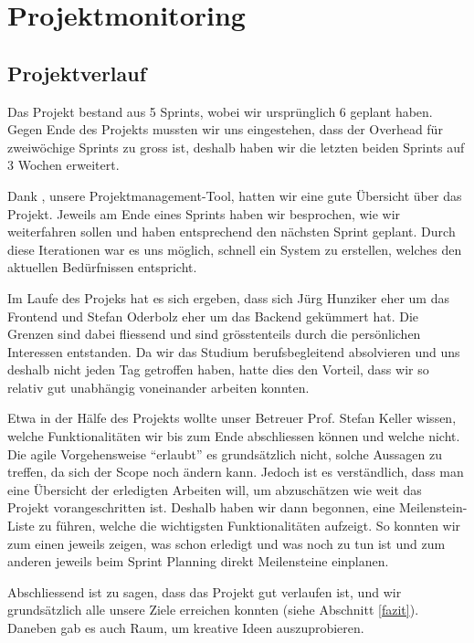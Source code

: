 \chapter{Projektmonitoring}
\label{projektmonitoring}





\section{Projektverlauf}
Das Projekt bestand aus 5 Sprints, wobei wir ursprünglich 6 geplant haben.
Gegen Ende des Projekts mussten wir uns eingestehen, dass der Overhead für zweiwöchige Sprints zu gross ist, deshalb haben wir die letzten beiden Sprints auf 3 Wochen erweitert.

Dank , unsere Projektmanagement-Tool, hatten wir eine gute Übersicht über das Projekt.
Jeweils am Ende eines Sprints haben wir besprochen, wie wir weiterfahren sollen und haben entsprechend den nächsten Sprint geplant.
Durch diese Iterationen war es uns möglich, schnell ein System zu erstellen, welches den aktuellen Bedürfnissen entspricht.

Im Laufe des Projeks hat es sich ergeben, dass sich Jürg Hunziker eher um das Frontend und Stefan Oderbolz eher um das Backend gekümmert hat.
Die Grenzen sind dabei fliessend und sind grösstenteils durch die persönlichen Interessen entstanden.
Da wir das Studium berufsbegleitend absolvieren und uns deshalb nicht jeden Tag getroffen haben, hatte dies den Vorteil, dass wir so relativ gut unabhängig voneinander arbeiten konnten.

Etwa in der Hälfe des Projekts wollte unser Betreuer Prof. Stefan Keller wissen, welche Funktionalitäten wir bis zum Ende abschliessen können und welche nicht.
Die agile Vorgehensweise "`erlaubt"' es grundsätzlich nicht, solche Aussagen zu treffen, da sich der Scope noch ändern kann.
Jedoch ist es verständlich, dass man eine Übersicht der erledigten Arbeiten will, um abzuschätzen wie weit das Projekt vorangeschritten ist.
Deshalb haben wir dann begonnen, eine Meilenstein-Liste zu führen, welche die wichtigsten Funktionalitäten aufzeigt.
So konnten wir zum einen jeweils zeigen, was schon erledigt und was noch zu tun ist und zum anderen jeweils beim Sprint Planning direkt Meilensteine einplanen.

Abschliessend ist zu sagen, dass das Projekt gut verlaufen ist, und wir grundsätzlich alle unsere Ziele erreichen konnten (siehe Abschnitt \ref{fazit}).
Daneben gab es auch Raum, um kreative Ideen auszuprobieren.

